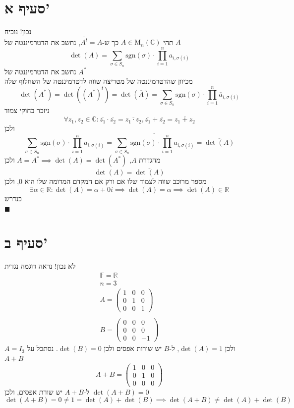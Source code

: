\documentclass[12pt, titlepage]{article}
\begin{document}
\section*{סעיף א'}
נכון! נוכיח\\
תהי $A\in \mathrm{M}_n\left(\mathbb{C}\right)$ כך ש-$\overline{A^t} = A$, נחשב את הדטרמיננטה של $A$
\[
    \det\left(A\right) = \sum_{\sigma \in S_n} \mathrm{sgn}\left(\sigma\right) \cdot \prod_{i=1}^{n} a_{i,\sigma\left(i\right)}
\]
נחשב את הדטרמיננטה של $A^*$\\
מכיוון שהדטרמיננטה של מטריצה שווה לדטרמיננטה של השחלוף שלה
\[
    \det\left(A^*\right) = \det\left(\left(A^*\right)^t\right) = \det\left(\overline{A}\right) = \sum_{\sigma \in S_n} \mathrm{sgn}\left(\sigma\right) \cdot \prod_{i=1}^n \overline{a}_{i,\sigma\left(i\right)}
\]
ניזכר בחוקי צמוד
\[
    \forall z_1,z_2 \in \mathbb{C}: \overline{z_1} \cdot \overline{z_2} = \overline{z_1 \cdot z_2},\overline{z_1} + \overline{z_2} = \overline{z_1 + z_2} 
\]
ולכן
\[
 \sum_{\sigma \in S_n} \mathrm{sgn}\left(\sigma\right) \cdot \prod_{i=1}^n \overline{a}_{i,\sigma\left(i\right)}=
 \overline{\sum_{\sigma \in S_n} \mathrm{sgn}\left(\sigma\right) \cdot \prod_{i=1}^n a_{i,\sigma\left(i\right)}}= \overline{\det\left(A\right)}
\]
מהגדרת $A$, $A=A^*\implies \det\left(A\right) = \det\left(A^*\right)$ ולכן
\[
    \det\left(A\right) = \overline{\det\left(A\right)}
\]
מספר מרוכב שווה לצמוד שלו אם ורק אם המקדם המדומה שלו הוא $0$, ולכן
\[
    \exists \alpha \in \mathbb{R} :    \det\left(A\right) = \alpha + 0i \implies \det\left(A\right) = \alpha \implies \boxed{\det\left(A\right) \in \mathbb{R}}
\]
כנדרש\\
$\blacksquare$
\section*{סעיף ב'}
לא נכון! נראה דוגמה נגדית
\begin{gather*}
    \mathbb{F} = \mathbb{R} \\
    n = 3\\
    A = \begin{pmatrix}
        1 & 0 & 0 \\
        0 & 1 & 0 \\
        0 & 0 & 1
    \end{pmatrix} \\ \\
    B = \begin{pmatrix}
        0 & 0 & 0 \\
        0 & 0 & 0 \\
        0 & 0 & -1
    \end{pmatrix}
\end{gather*}
$A=I_3$ ולכן $\det\left(A\right)=1$, ל-$B$ יש שורות אפסים ולכן $\det\left(B\right)=0$. נסתכל על $A+B$
\[
A+B = \begin{pmatrix}
    1 & 0 & 0 \\
    0 & 1 & 0\\
    0 & 0 & 0
\end{pmatrix}
\]
ל-$A+B$ יש שורת אפסים, ולכן $\det\left(A+B\right)=0$
\[
    \det\left(A+B\right) = 0 \neq 1 = \det\left(A\right) + \det\left(B\right) \implies \det\left(A+B\right) \neq \det\left(A\right) + \det\left(B\right)
\]
\end{document}
